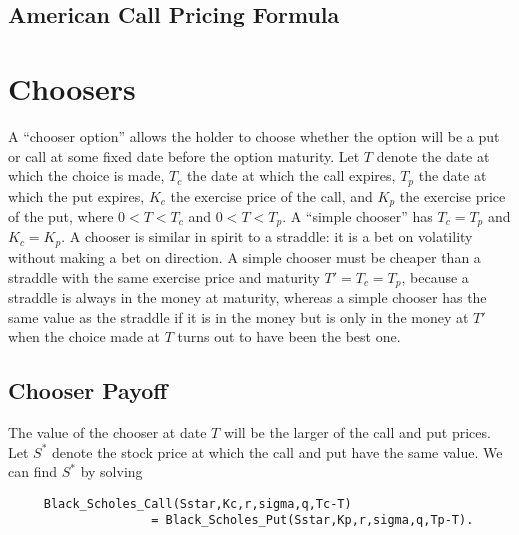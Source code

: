 \subsection*{American Call Pricing Formula}





\section{Choosers}\label{s_choosers}
A ``chooser option''  allows the holder to choose whether the option will be a put or call at some fixed date before the option maturity.  Let $T$ denote the date at which the choice is made, $T_c$ the date at which the call expires, $T_p$ the date at which the put expires, $K_c$ the exercise price of the call, and $K_p$ the exercise price of the put, where $0<T<T_c$ and $0<T<T_p$.  A ``simple chooser'' has $T_c=T_p$ and $K_c=K_p$.  A chooser is similar in spirit to a straddle: it is a bet on volatility without making a bet on direction.  A simple chooser must be cheaper than a straddle with the same exercise price and maturity $T'=T_c=T_p$, because a straddle is always in the money at maturity, whereas a simple chooser has the same value as the straddle if it is in the money but is only in the money at $T'$ when the choice made at $T$ turns out to have been the best one.  

\subsection*{Chooser Payoff}
The value of the chooser at date $T$ will be the larger of the call and put prices.  Let $S^*$ denote the stock price at which the call and put have the same value.  We can find $S^*$ by solving
\small\begin{verbatim}
     Black_Scholes_Call(Sstar,Kc,r,sigma,q,Tc-T) 
                    = Black_Scholes_Put(Sstar,Kp,r,sigma,q,Tp-T).                           
\end{verbatim}
\normalsize

